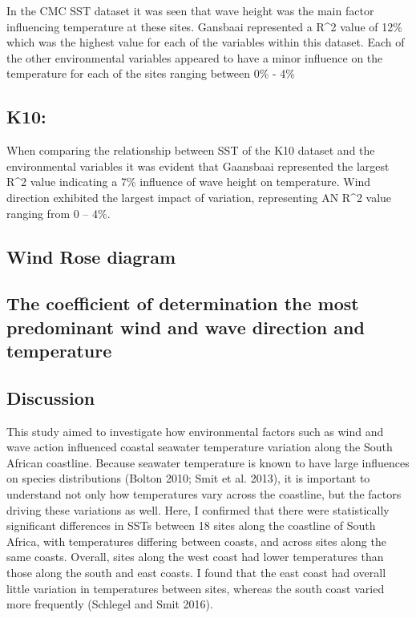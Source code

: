 \documentclass[12pt,]{article}
\begin{document}
In the CMC SST dataset it was seen that wave height was the main factor
influencing temperature at these sites. Gansbaai represented a R\^{}2
value of 12\% which was the highest value for each of the variables
within this dataset. Each of the other environmental variables appeared
to have a minor influence on the temperature for each of the sites
ranging between 0\% - 4\%

\subsection{K10:}\label{k10-1}

When comparing the relationship between SST of the K10 dataset and the
environmental variables it was evident that Gaansbaai represented the
largest R\^{}2 value indicating a 7\% influence of wave height on
temperature. Wind direction exhibited the largest impact of variation,
representing AN R\^{}2 value ranging from 0 -- 4\%.

\subsection{Wind Rose diagram}\label{wind-rose-diagram}

\subsection{The coefficient of determination the most predominant wind
and wave direction and
temperature}\label{the-coefficient-of-determination-the-most-predominant-wind-and-wave-direction-and-temperature}

\subsection{Discussion}\label{discussion}

This study aimed to investigate how environmental factors such as wind
and wave action influenced coastal seawater temperature variation along
the South African coastline. Because seawater temperature is known to
have large influences on species distributions (Bolton 2010; Smit et al.
2013), it is important to understand not only how temperatures vary
across the coastline, but the factors driving these variations as well.
Here, I confirmed that there were statistically significant differences
in SSTs between 18 sites along the coastline of South Africa, with
temperatures differing between coasts, and across sites along the same
coasts. Overall, sites along the west coast had lower temperatures than
those along the south and east coasts. I found that the east coast had
overall little variation in temperatures between sites, whereas the
south coast varied more frequently (Schlegel and Smit 2016).
\end{document}
